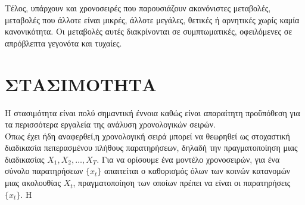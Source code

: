 Τέλος, υπάρχουν και χρονοσειρές που παρουσιάζουν ακανόνιστες μεταβολές, μεταβολές που άλλοτε είναι μικρές, άλλοτε μεγάλες, θετικές ή αρνητικές
χωρίς καμία κανονικότητα. Οι μεταβολές αυτές διακρίνονται σε συμπτωματικές,
οφειλόμενες σε απρόβλεπτα γεγονότα και τυχαίες.
\section{ΣΤΑΣΙΜΟΤΗΤΑ}
Η στασιμότητα είναι πολύ σημαντική έννοια καθώς είναι απαραίτητη προϋπόθεση για τα περισσότερα εργαλεία της ανάλυση χρονολογικών σειρών.\\

Όπως έχει ήδη αναφερθεί,η χρονολογική σειρά μπορεί να θεωρηθεί ως στοχαστική
διαδικασία πεπερασμένου πλήθους παρατηρήσεων, δηλαδή την πραγματοποίηση μιας διαδικασίας $ X_1,X_2,\ldots,X_T.$ Για να ορίσουμε ένα μοντέλο χρονοσειρών, για ένα σύνολο παρατηρήσεων $\{x_t\} $
απαιτείται ο καθορισμός όλων των κοινών κατανομών μιας ακολουθίας $ X_t$, πραγματοποίηση των οποίων πρέπει να είναι οι παρατηρήσεις $\{x_t\}. $ Η



